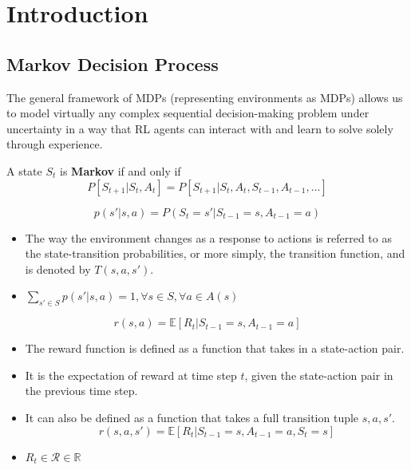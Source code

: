 \chapter{Introduction}
\section{Markov Decision Process}

The general framework of MDPs (representing environments as MDPs) allows us to model virtually any complex sequential decision-making problem under uncertainty in a way that RL agents can interact with and learn to solve solely through experience. 


\begin{definition}
	A state $S_t$ is \textbf{Markov} if and only if 
	$$P[S_{t+1}|S_t, A_t] = P[S_{t+1}|S_t, A_t, S_{t-1},A_{t-1},...]$$
\end{definition}

\begin{definition}
	$$p(s'|s,a) = P(S_t=s'|S_{t-1}=s,A_{t-1}=a)$$
\end{definition}
\begin{itemize}
	\item The way the environment changes as a response to actions is referred to as the state-transition probabilities, or more simply, the transition function, and is denoted by $T(s,a,s')$.
	\item $\sum_{s'\in S}p(s'|s,a) = 1, \forall s \in S, \forall a\in A(s)$
\end{itemize}

\begin{definition}
	$$r(s,a) =\mathbb{E}[R_t|S_{t-1}=s,A_{t-1}=a] $$
\end{definition}
\begin{itemize}
	\item The reward function is defined as a function that takes in a state-action pair.
	\item It is the expectation of reward at time step $t$, given the state-action pair in the previous time step.
	\item It can also be defined as a function that takes a full transition tuple $s,a,s'$.
		$$r(s,a,s') =\mathbb{E}[R_t|S_{t-1}=s,A_{t-1}=a,S_{t}=s]$$
	\item $R_t\in \mathcal{R}\in \mathbb{R}$
\end{itemize}

